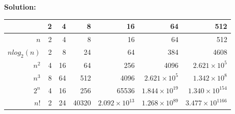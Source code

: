 \documentclass[]{article}
\newcommand{\solution}{\vskip 0.5cm \textbf{\large Solution:} \\}
\begin{document}
\begin{enumerate}[resume]
	  \solution
      \begin{tabular}{|r||r|r|r|r|r|r|}
        \hline
        & 2 & 4 & 8 & 16 & 64 & 512 \\
        \hline
        \hline
        $n$ & 2 & 4 & 8 & 16 & 64 & 512 \\
        \hline
        $n log_2(n)$ & 2 & 8 & 24 & 64 & 384 & 4608 \\
        \hline
        $n^2$ & 4 & 16 & 64 & 256 & 4096 & $2.621 \times 10^{5}$ \\
        \hline
        $n^3$ & 8 & 64 & 512 & 4096 & $2.621 \times 10^{5}$ & $1.342 \times 10^{8}$ \\
        \hline
        $2^n$ & 4 & 16 & 256 & 65536 & $1.844 \times 10^{19}$ & $1.340 \times 10^{154}$ \\
        \hline
        $n!$ & 2 & 24 & 40320 & $2.092 \times 10^{13}$ & $1.268 \times 10^{89}$ & $3.477 \times 10^{1166}$ \\
        \hline
      \end{tabular}
      
    \end{enumerate}
\end{document}

